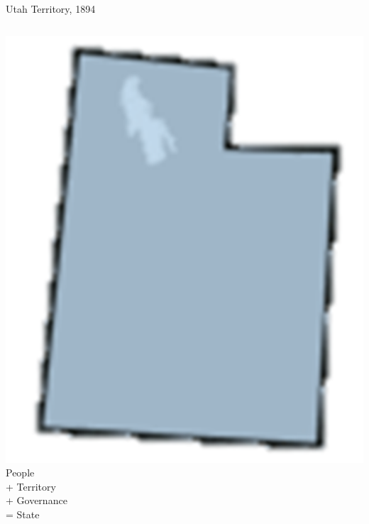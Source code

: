 \begin{frame}{Utah Territory, 1894}
    \begin{columns}[onlytextwidth]
            \centering
            \includegraphics[height=0.75\textheight]{img/utah-state.png} \\

            \Huge{People \\ + Territory \\ + Governance \\ = State}
    \end{columns}
\end{frame}

